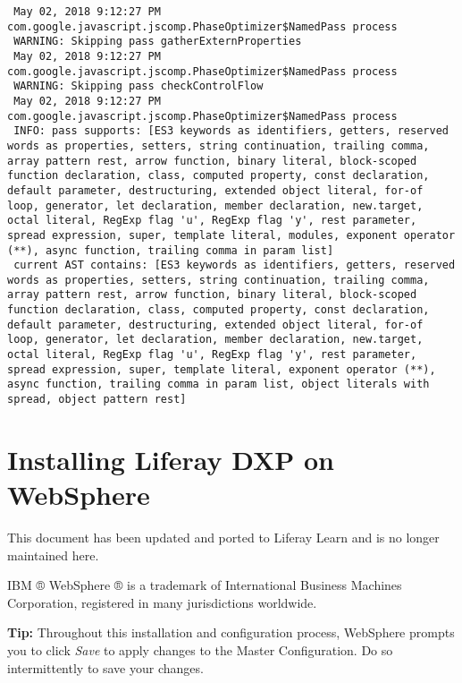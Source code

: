 \begin{verbatim}
 May 02, 2018 9:12:27 PM com.google.javascript.jscomp.PhaseOptimizer$NamedPass process
 WARNING: Skipping pass gatherExternProperties
 May 02, 2018 9:12:27 PM com.google.javascript.jscomp.PhaseOptimizer$NamedPass process
 WARNING: Skipping pass checkControlFlow
 May 02, 2018 9:12:27 PM com.google.javascript.jscomp.PhaseOptimizer$NamedPass process
 INFO: pass supports: [ES3 keywords as identifiers, getters, reserved words as properties, setters, string continuation, trailing comma, array pattern rest, arrow function, binary literal, block-scoped function declaration, class, computed property, const declaration, default parameter, destructuring, extended object literal, for-of loop, generator, let declaration, member declaration, new.target, octal literal, RegExp flag 'u', RegExp flag 'y', rest parameter, spread expression, super, template literal, modules, exponent operator (**), async function, trailing comma in param list]
 current AST contains: [ES3 keywords as identifiers, getters, reserved words as properties, setters, string continuation, trailing comma, array pattern rest, arrow function, binary literal, block-scoped function declaration, class, computed property, const declaration, default parameter, destructuring, extended object literal, for-of loop, generator, let declaration, member declaration, new.target, octal literal, RegExp flag 'u', RegExp flag 'y', rest parameter, spread expression, super, template literal, exponent operator (**), async function, trailing comma in param list, object literals with spread, object pattern rest]
\end{verbatim}

\chapter{Installing Liferay DXP on
WebSphere}\label{installing-liferay-dxp-on-websphere}

{This document has been updated and ported to Liferay Learn and is no
longer maintained here.}

IBM ® WebSphere ® is a trademark of International Business Machines
Corporation, registered in many jurisdictions worldwide.

\noindent\hrulefill

\textbf{Tip:} Throughout this installation and configuration process,
WebSphere prompts you to click \emph{Save} to apply changes to the
Master Configuration. Do \textbar{} so intermittently to save your
changes.

